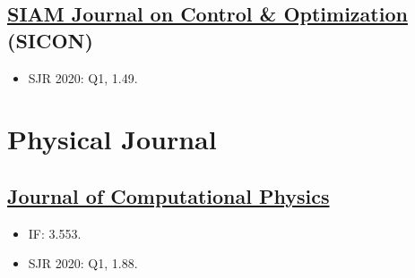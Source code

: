 \documentclass{article}
\numberwithin{equation}{section}
\begin{document}
\subsection{\href{https://www.siam.org/publications/journals/siam-journal-on-control-and-optimization-sicon}{SIAM Journal on Control \& Optimization} (SICON)}
\begin{itemize}
	\item SJR 2020: Q1, 1.49.
\end{itemize}

\section{Physical Journal}

\subsection{\href{https://www.journals.elsevier.com/journal-of-computational-physics}{Journal of Computational Physics}}
\begin{itemize}
	\item IF: 3.553.
	\item SJR 2020: Q1, 1.88.
\end{itemize}


\printbibliography[heading=bibintoc]
\end{document}
